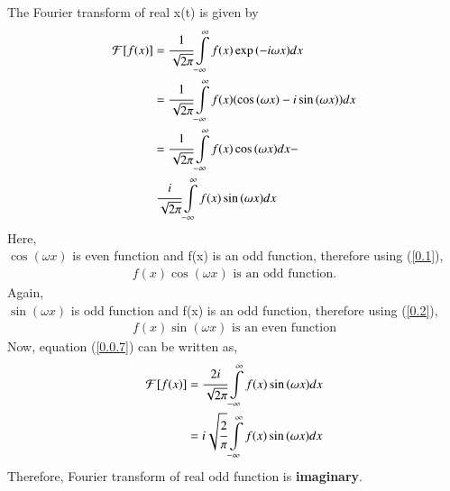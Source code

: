 \documentclass[journal,12pt,twocolumn]{IEEEtran}
\begin{document}
The Fourier transform of real x(t) is given by
\begin{align}
    \mathcal{F}[f(x)] &= \cfrac{1}{\sqrt{2\pi}}\displaystyle\int\limits_{-\infty}^{\infty} f(x)\exp{(-i\omega x)}dx\\
    &= \cfrac{1}{\sqrt{2\pi}}\displaystyle\int\limits_{-\infty}^{\infty} f(x)(\cos{(\omega x)} - i\sin{(\omega x)})dx\\
    &= \cfrac{1}{\sqrt{2\pi}}\displaystyle\int\limits_{-\infty}^{\infty} f(x)\cos{(\omega x)}dx -\nonumber \\ 
    &\text{ }\cfrac{i}{\sqrt{2\pi}}\displaystyle\int\limits_{-\infty}^{\infty} f(x)\sin{(\omega x)}dx \label{0.0.7}
\end{align}
Here, \\
$\cos{(\omega x)}$ is even function and f(x) is an odd function, therefore using (\ref{0.1}),
\begin{align}
    f(x)\cos{(\omega x)} \text{ is an odd function.}
\end{align}
Again,\\
$\sin{(\omega x)}$ is odd function and f(x) is an odd function, therefore using (\ref{0.2}),
\begin{align}
   f(x)\sin{(\omega x)} \text{ is an even function} 
\end{align}
Now, equation (\ref{0.0.7}) can be written as,
\begin{align}
    \mathcal{F}[f(x)] &= \cfrac{2i}{\sqrt{2\pi}}\displaystyle\int\limits_{-\infty}^{\infty} f(x)\sin{(\omega x)}dx\\
    &= i\sqrt{\cfrac{2}{\pi}}\displaystyle\int\limits_{-\infty}^{\infty} f(x)\sin{(\omega x)}dx
\end{align}
Therefore, Fourier transform of real odd function is \textbf{imaginary}.\\
\end{document}

